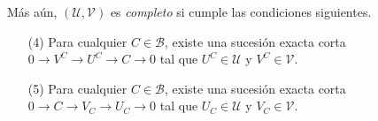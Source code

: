 \documentclass[preview]{standalone}
\begin{document}
\begin{center}
\flushleft Más aún, $(\mathcal{U}, \mathcal{V})$ es \emph{completo} si cumple las condiciones siguientes.\begin{itemize} \item[(4)] Para cualquier $C\in\mathscr{B}$, existe una sucesión exacta corta $0\to V^C\to U^C\to C\to 0$ tal que $U^C\in\mathcal{U}$ y $V^C\in\mathcal{V}$. \item[(5)] Para cualquier $C\in\mathscr{B}$, existe una sucesión exacta corta $0\to C\to V_C\to U_C\to 0$ tal que $U_C\in\mathcal{U}$ y $V_C\in\mathcal{V}$. \end{itemize}
\end{center}
\end{document}
